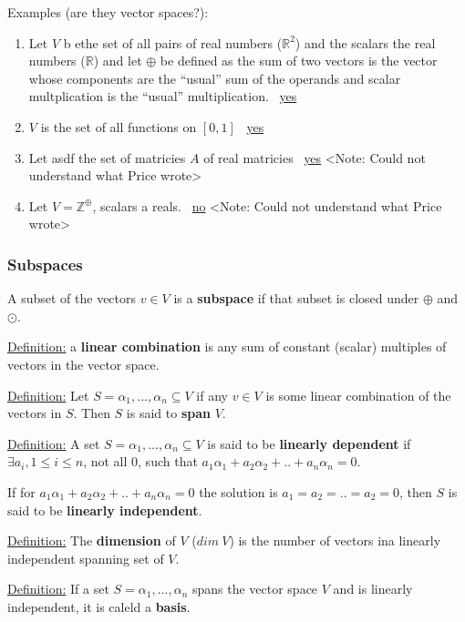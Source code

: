 Examples (are they vector spaces?):

\begin{enumerate}
  \item Let $V$ b ethe set of all pairs of real numbers ($\mathbb{R} ^ 2$) and the scalars the real numbers ($\mathbb{R}$) and let $\oplus$ be defined as the sum of two vectors is the vector whose components are the ``usual'' sum of the operands and scalar multplication is the ``usual'' multiplication. \textrightarrow\ \underline{yes}

  \item $V$ is the set of all functions on $[0,1]$ \textrightarrow\ \underline{yes}

  \item Let asdf the set of matricies $A$ of real matricies \textrightarrow\ \underline{yes} <Note: Could not understand what Price wrote>

  \item Let $V = \mathbb{Z}^\oplus$, scalars a reals. \textrightarrow\ \underline{no} <Note: Could not understand what Price wrote>
\end{enumerate}


\subsubsection{Subspaces}

A subset of the vectors $v \in V$ is a \textbf{subspace} if that subset is closed under $\oplus$ and $\odot$.

\underline{Definition:} a \textbf{linear combination} is any sum of constant (scalar) multiples of vectors in the vector space.

\underline{Definition:} Let $S = {\alpha_1, ..., \alpha_n} \subseteq V$ if any $v \in V$ is some linear combination of the vectors in $S$. Then $S$ is said to \textbf{span} $V$.

\underline{Definition:} A set $S = {\alpha_1, ..., \alpha_n} \subseteq V$ is said to be \textbf{linearly dependent} if $\exists a_i, 1 \leq i \leq n$, not all 0, such that $a_1 \alpha_1 + a_2 \alpha_2 + .. + a_n \alpha_n = 0$.

If for $a_1 \alpha_1 + a_2 \alpha_2 + .. + a_n \alpha_n = 0$ the solution is $a_1 = a_2 = .. = a_2 = 0$, then $S$ is said to be \textbf{linearly independent}.

\underline{Definition:} The \textbf{dimension} of $V$ ($dim\ V$) is the number of vectors ina  linearly independent spanning set of $V$.

\underline{Definition:} If a set $S = {\alpha_1, ..., \alpha_n}$ spans the vector space $V$ and is linearly independent, it is caleld a \textbf{basis}.